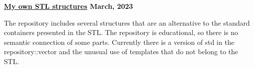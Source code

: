 \textbf{\href{https://github.com/jirol9xa/MySTL} {My own STL structures} \hfill  March, 2023} \par
\begin{itemize}
The repository includes several structures that are an alternative to the standard containers presented in the STL. The repository is educational, so there is no semantic connection of some parts. Currently there is a version of std in the repository::vector and the unusual use of templates that do not belong to the STL.
\end{itemize} \par